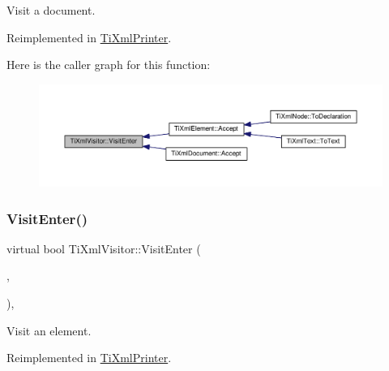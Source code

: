 Visit a document. 



Reimplemented in \hyperlink{class_ti_xml_printer_a2ec73087db26ff4d2c4316c56f861db7}{Ti\+Xml\+Printer}.

Here is the caller graph for this function\+:
\nopagebreak
\begin{figure}[H]
\begin{center}
\leavevmode
\includegraphics[width=350pt]{class_ti_xml_visitor_a07baecb52dd7d8716ae2a48ad0956ee0_icgraph}
\end{center}
\end{figure}
\mbox{\label{class_ti_xml_visitor_af6c6178ffa517bbdba95d70490875fff}} 
\subsubsection{\texorpdfstring{Visit\+Enter()}{VisitEnter()}\hspace{0.1cm}{\footnotesize\ttfamily [2/2]}}
{\footnotesize\ttfamily virtual bool Ti\+Xml\+Visitor\+::\+Visit\+Enter (\begin{DoxyParamCaption}\item[{const \hyperlink{class_ti_xml_element}{Ti\+Xml\+Element} \&}]{,  }\item[{const \hyperlink{class_ti_xml_attribute}{Ti\+Xml\+Attribute} $\ast$}]{ }\end{DoxyParamCaption})\hspace{0.3cm}{\ttfamily [inline]}, {\ttfamily [virtual]}}



Visit an element. 



Reimplemented in \hyperlink{class_ti_xml_printer_a6dccaf5ee4979f13877690afe28721e8}{Ti\+Xml\+Printer}.

\mbox{\label{class_ti_xml_visitor_aa0ade4f27087447e93974e975c3246ad}} 
